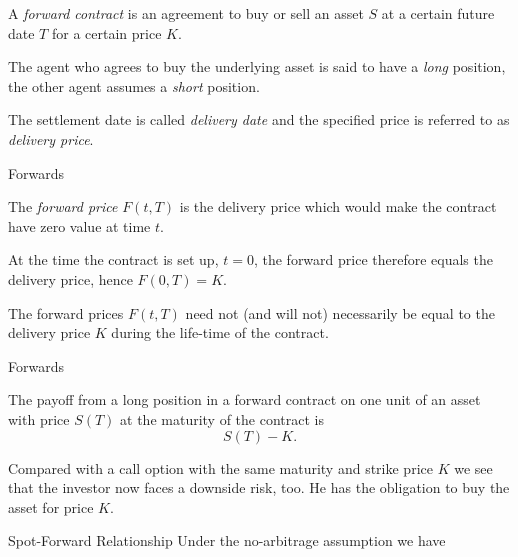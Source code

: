 	
A {\it forward contract}
is an agreement to buy or sell an asset $S$ at a certain future
date $T$ for a certain price $K$.


	
The agent who agrees to
buy the underlying asset is said to have a {\it long} position,
the other agent assumes a {\it short} position.


	The settlement
date is called {\it delivery date} and the specified price is
referred to as {\it delivery price}.





{Forwards}






	The {\it forward
price} $F(t,T)$ is the delivery price which would make the
contract have zero value at time $t$.


	At the time the contract is set up, $t=0$,
the forward price therefore equals the delivery price, hence
$F(0,T) = K$.


	
The forward prices $F(t,T)$ need not (and will not)
necessarily be equal to the delivery price $K$ during the
life-time of the contract.





{Forwards}






	
The payoff from a long position in a forward contract on one unit
of an asset with price $S(T)$ at the maturity of the contract is
$$ S(T)-K.$$


	Compared with a call option with the same maturity
and strike price $K$ we see that the investor now faces a downside
risk, too. He has the obligation to buy the asset for price $K$.





{Spot-Forward Relationship}
Under the no-arbitrage assumption we have

\begin{center}
\end{center}

